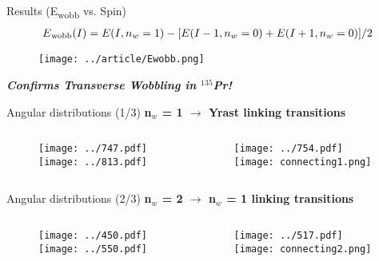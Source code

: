 \documentclass [11pt]{beamer}
\begin{document}
\begin{frame}{Results (E\textsubscript{wobb} vs. Spin)}
\centering
\begin{align*}
E\textsubscript{wobb}(\mathnormal{I}) = E(\mathnormal{I},n_{w}=1) - [E(\mathnormal{I}-1,n_{w}=0) + E(\mathnormal{I}+1,n_{w}=0)]/2
\end{align*}
\begin{figure}
\texttt{[image: ../article/Ewobb.png]}
\end{figure}
\textbf{\textit{Confirms Transverse Wobbling in $^{135}$Pr!}}
\end{frame}

\begin{frame}{Angular distributions (1/3)}
\centering
\textbf{n$_{w}$ = 1 $\rightarrow$ Yrast linking transitions}
\begin{columns}[c]
\begin{column}{0.5\textwidth}
\begin{figure}
\texttt{[image: ../747.pdf]}
\\\texttt{[image: ../813.pdf]}
\end{figure}
\end{column}
\begin{column}{0.5\textwidth}
\begin{figure}
\texttt{[image: ../754.pdf]}
\\\texttt{[image: connecting1.png]}
\end{figure}
\end{column}
\end{columns}
\end{frame}


\begin{frame}{Angular distributions (2/3)}
\centering
\textbf{n$_{w}$ = 2 $\rightarrow$ n$_{w}$ = 1 linking transitions}
\begin{columns}[c]
\begin{column}{0.5\textwidth}
\begin{figure}
\texttt{[image: ../450.pdf]}\\
\texttt{[image: ../550.pdf]}
\end{figure}
\end{column}
\begin{column}{0.5\textwidth}
\begin{figure}
\texttt{[image: ../517.pdf]}\\
\texttt{[image: connecting2.png]}
\end{figure}
\end{column}
\end{columns}
\end{frame}
\end{document}
